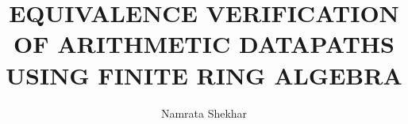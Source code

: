 %
\RequirePackage{times}
\def\algorithm{\bgroup\obeylines\obeyspaces\def\ {\quad}
\footnotesize\tt\leftskip=1pc\vskip4pt\relax}
\def\endalgorithm{\vskip4pt\egroup}
\def\BibTeX{{\rm B\kern-.05em{\sc i\kern-.025em b}\kern-.08em
    T\kern-.1667em\lower.7ex\hbox{E}\kern-.125emX}}
\newtheorem{Theorem}{Theorem}
\setcounter{page}{1}

\def\tabnote#1{{\small{#1}}}

\newcommand{\ls}[1]
    {\dimen0=\fontdimen6\the\font
     \lineskip=#1\dimen0
     \advance\lineskip.5\fontdimen5\the\font
     \advance\lineskip-\dimen0
     \lineskiplimit=.9\lineskip
     \baselineskip=\lineskip
     \advance\baselineskip\dimen0
     \normallineskip\lineskip
     \normallineskiplimit\lineskiplimit
     \normalbaselineskip\baselineskip
     \ignorespaces
    }

\newcommand{\beq}{\begin{equation}}
\newcommand{\eeq}{\end{equation}}
\newcommand{\ov}{\bar}
\newcommand{\xor}{\bigoplus}
\newcommand{\beqarr}{\begin{eqnarray}}
\newcommand{\eeqarr}{\end{eqnarray}}
\newcommand{\tab}{\xspace\ \ \ \ \xspace}
\newcommand{\ttab}{\xspace\ \ \xspace}

\newtheorem{Definition}{Definition}[chapter]
\newtheorem{Example}{Example}[chapter]
\newtheorem{Proposition}{Proposition}[chapter]
\newtheorem{Lemma}{Lemma}[chapter]
\newtheorem{Corollary}{Corollary}[chapter]


\title{EQUIVALENCE VERIFICATION OF ARITHMETIC DATAPATHS USING FINITE
  RING ALGEBRA} 
\author{Namrata Shekhar} 
\dedication{To Sujiet, my parents and Puttu.}



